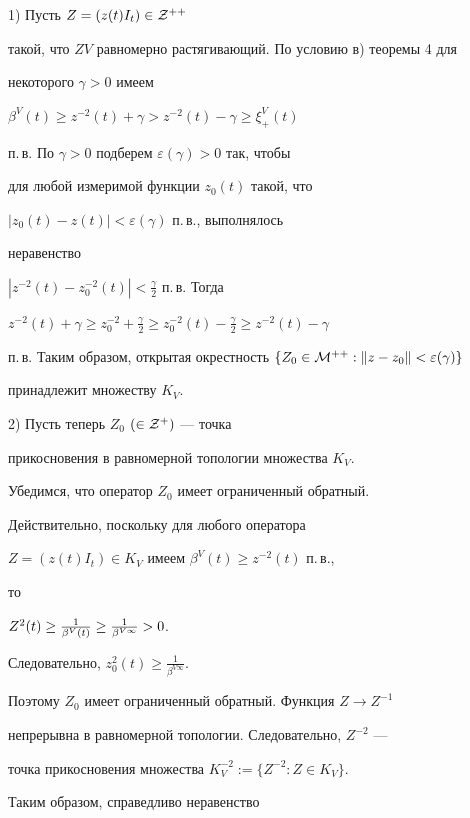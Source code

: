 \begin{pf}


1) Пусть $Z=(z(t)I_{t})\in {\cal Z}^{++}$


такой, что $ZV$ равномерно растягивающий. По условию в) теоремы 4 для


некоторого $\gamma >0$ имеем


$\beta^{V}(t)\geq z^{-2}(t)+\gamma


>z^{-2}(t)-\gamma\geq\xi_{+}^{V}(t)$


п.\,в. По $\gamma >0$ подберем $\varepsilon (\gamma )>0$ так, чтобы


для любой измеримой функции $z_{0}(t)$ такой, что


$|z_{0}(t)-z(t)| <\varepsilon (\gamma )$ п.\,в., выполнялось


неравенство


$| z^{-2}(t)-z_{0}^{-2}(t)|<\frac{\gamma}{2}$ п.\,в. Тогда


$z^{-2}(t)+\gamma\geq z^{-2}_{0}+\frac{\gamma}{2}\geq


z^{-2}_{0}(t)-\frac{\gamma}{2}\geq z^{-2}(t)-\gamma$


п.\,в. Таким образом, открытая окрестность $\{Z_{0}\in


{\cal M}^{++}: \| z-z_{0}\| <\varepsilon (\gamma )\}$


принадлежит множеству $K_{V}$.





2) Пусть теперь $Z_{0}$ $(\in {\cal Z}^{+})$ --- точка


прикосновения в равномерной топологии множества $K_{V}$.


Убедимся, что оператор $Z_{0}$ имеет ограниченный обратный.


Действительно, поскольку для любого оператора


$Z=(z(t)I_{t})\in K_{V}$ имеем $\beta^{V}(t)\geq z^{-2}(t)$ п.\,в.,


то


$Z^{2}(t)\geq \frac{1}{\beta^{V}(t)}\geq {1\over\beta^{V\infty}}>0$.


Следовательно, $z^{2}_{0}(t)\geq \frac{1}{\beta^{V\infty}}$.


Поэтому $Z_{0}$ имеет ограниченный обратный. Функция $Z\to Z^{-1}$


непрерывна в равномерной топологии. Следовательно, $Z^{-2}$ ---


точка прикосновения множества $K_{V}^{-2}:=\{Z^{-2}: Z\in K_{V}\}$.


Таким образом, справедливо неравенство



\end{pf}
